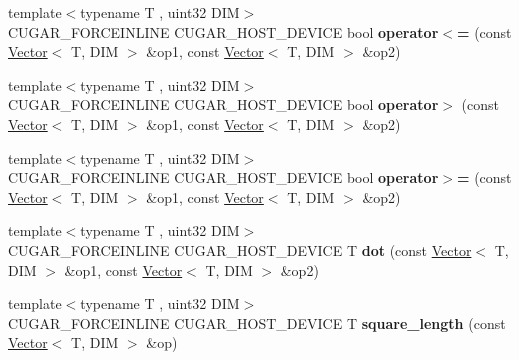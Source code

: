 \begin{DoxyCompactItemize}
\mbox{\label{namespacecugar_adf45e4e6837c1670a3bd08225bb373a7}} 
{\footnotesize template$<$typename T , uint32 D\+IM$>$ }\\C\+U\+G\+A\+R\+\_\+\+F\+O\+R\+C\+E\+I\+N\+L\+I\+NE C\+U\+G\+A\+R\+\_\+\+H\+O\+S\+T\+\_\+\+D\+E\+V\+I\+CE bool {\bfseries operator$<$=} (const \hyperlink{structcugar_1_1_vector}{Vector}$<$ T, D\+IM $>$ \&op1, const \hyperlink{structcugar_1_1_vector}{Vector}$<$ T, D\+IM $>$ \&op2)
\item 
\mbox{\label{namespacecugar_abd11a43b113f33571cc27bde383bcead}} 
{\footnotesize template$<$typename T , uint32 D\+IM$>$ }\\C\+U\+G\+A\+R\+\_\+\+F\+O\+R\+C\+E\+I\+N\+L\+I\+NE C\+U\+G\+A\+R\+\_\+\+H\+O\+S\+T\+\_\+\+D\+E\+V\+I\+CE bool {\bfseries operator$>$} (const \hyperlink{structcugar_1_1_vector}{Vector}$<$ T, D\+IM $>$ \&op1, const \hyperlink{structcugar_1_1_vector}{Vector}$<$ T, D\+IM $>$ \&op2)
\item 
\mbox{\label{namespacecugar_a3b49a58b68519f889c9d948749afe9b6}} 
{\footnotesize template$<$typename T , uint32 D\+IM$>$ }\\C\+U\+G\+A\+R\+\_\+\+F\+O\+R\+C\+E\+I\+N\+L\+I\+NE C\+U\+G\+A\+R\+\_\+\+H\+O\+S\+T\+\_\+\+D\+E\+V\+I\+CE bool {\bfseries operator$>$=} (const \hyperlink{structcugar_1_1_vector}{Vector}$<$ T, D\+IM $>$ \&op1, const \hyperlink{structcugar_1_1_vector}{Vector}$<$ T, D\+IM $>$ \&op2)
\item 
\mbox{\label{namespacecugar_a52585d646825b7d54e00a8ffa6729af5}} 
{\footnotesize template$<$typename T , uint32 D\+IM$>$ }\\C\+U\+G\+A\+R\+\_\+\+F\+O\+R\+C\+E\+I\+N\+L\+I\+NE C\+U\+G\+A\+R\+\_\+\+H\+O\+S\+T\+\_\+\+D\+E\+V\+I\+CE T {\bfseries dot} (const \hyperlink{structcugar_1_1_vector}{Vector}$<$ T, D\+IM $>$ \&op1, const \hyperlink{structcugar_1_1_vector}{Vector}$<$ T, D\+IM $>$ \&op2)
\item 
\mbox{\label{namespacecugar_a981df7db00eb0a4ff63447fa32b2bb45}} 
{\footnotesize template$<$typename T , uint32 D\+IM$>$ }\\C\+U\+G\+A\+R\+\_\+\+F\+O\+R\+C\+E\+I\+N\+L\+I\+NE C\+U\+G\+A\+R\+\_\+\+H\+O\+S\+T\+\_\+\+D\+E\+V\+I\+CE T {\bfseries square\+\_\+length} (const \hyperlink{structcugar_1_1_vector}{Vector}$<$ T, D\+IM $>$ \&op)

\end{DoxyCompactItemize}
